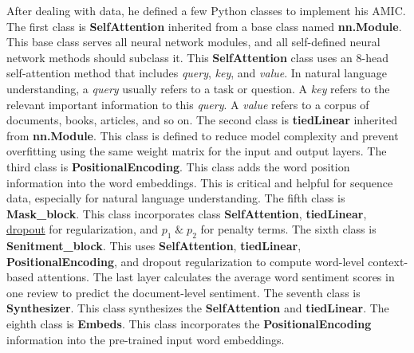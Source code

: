 \documentclass[aoas]{imsart}
\numberwithin{equation}{section}
\theoremstyle{plain}
\theoremstyle{remark}
\begin{document}
After dealing with data, he defined a few Python classes to implement his AMIC. The first class is \textbf{SelfAttention} inherited from a base class named \textbf{nn.Module}. This base class serves all neural network modules, and all self-defined neural network methods should subclass it. This \textbf{SelfAttention} class uses an 8-head self-attention method that includes \textit{query}, \textit{key}, and \textit{value}. In natural language understanding, a \textit{query} usually refers to a task or question. A \textit{key} refers to the relevant important information to this \textit{query}. A \textit{value} refers to a corpus of documents, books, articles, and so on. The second class is \textbf{tiedLinear} inherited from \textbf{nn.Module}. This class is defined to reduce model complexity and prevent overfitting using the same weight matrix for the input and output layers. The third class is \textbf{PositionalEncoding}. This class adds the word position information into the word embeddings. This is critical and helpful for sequence data, especially for natural language understanding. The fifth class is \textbf{Mask\_block}. This class incorporates class \textbf{SelfAttention}, \textbf{tiedLinear}, \href{https://pytorch.org/docs/stable/generated/torch.nn.Dropout.html}{dropout} for regularization, and $p_1 \;\&\; p_2$ for penalty terms. The sixth class is \textbf{Senitment\_block}. This uses \textbf{SelfAttention}, \textbf{tiedLinear}, \textbf{PositionalEncoding}, and dropout regularization to compute word-level context-based attentions. The last layer calculates the average word sentiment scores in one review to predict the document-level sentiment. The seventh class is \textbf{Synthesizer}. This class synthesizes the \textbf{SelfAttention} and \textbf{tiedLinear}. The eighth class is \textbf{Embeds}. This class incorporates the \textbf{PositionalEncoding} information into the pre-trained input word embeddings.
\end{document}
